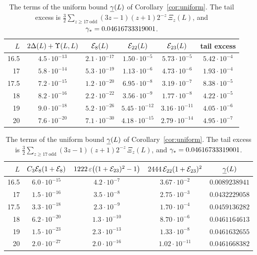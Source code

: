 \begin{table}[ht]
\centering\small
\begin{tabular}{@{}rccccc@{}}
\toprule
$L$ & $2\Delta(L)+\Upsilon(L,L)$ & $\mathcal{E}_8(L)$ & $\mathcal{E}_{22}(L)$ & $\mathcal{E}_{23}(L)$ & tail excess\\
\midrule
16.5 & $4.5\cdot10^{-13}$ & $2.1\cdot10^{-17}$ & $1.50\cdot10^{-5}$ & $5.73\cdot10^{-5}$ & $5.42\cdot10^{-4}$\\
17   & $5.8\cdot10^{-14}$ & $5.3\cdot10^{-19}$ & $1.13\cdot10^{-6}$ & $4.73\cdot10^{-6}$ & $1.93\cdot10^{-4}$\\
17.5 & $7.2\cdot10^{-15}$ & $1.2\cdot10^{-20}$ & $6.95\cdot10^{-8}$ & $3.19\cdot10^{-7}$ & $8.38\cdot10^{-5}$\\
18   & $8.2\cdot10^{-16}$ & $2.2\cdot10^{-22}$ & $3.56\cdot10^{-9}$ & $1.77\cdot10^{-8}$ & $4.22\cdot10^{-5}$\\
19   & $9.0\cdot10^{-18}$ & $5.2\cdot10^{-26}$ & $5.45\cdot10^{-12}$ & $3.16\cdot10^{-11}$ & $4.05\cdot10^{-6}$\\
20   & $7.6\cdot10^{-20}$ & $7.1\cdot10^{-30}$ & $4.18\cdot10^{-15}$ & $2.79\cdot10^{-14}$ & $4.95\cdot10^{-7}$\\
\bottomrule
\end{tabular}

\medskip
\begin{tabular}{@{}rcccc@{}}
\toprule
$L$ & $C_{3}\mathcal{E}_8(1+\mathcal{E}_8)$ & $1222\,\varepsilon\bigl((1+\mathcal{E}_{23})^2-1\bigr)$ & $2444\,\mathcal{E}_{22}(1+\mathcal{E}_{23})^2$ & $\underline{\gamma}(L)$\\
\midrule
16.5 & $6.0\cdot10^{-15}$ & $4.2\cdot10^{-7}$ & $3.67\cdot10^{-2}$ & $0.0089238941$\\
17   & $1.5\cdot10^{-16}$ & $3.5\cdot10^{-8}$ & $2.75\cdot10^{-3}$ & $0.0432229058$\\
17.5 & $3.3\cdot10^{-18}$ & $2.3\cdot10^{-9}$ & $1.70\cdot10^{-4}$ & $0.0459136282$\\
18   & $6.2\cdot10^{-20}$ & $1.3\cdot10^{-10}$ & $8.70\cdot10^{-6}$ & $0.0461164613$\\
19   & $1.5\cdot10^{-23}$ & $2.3\cdot10^{-13}$ & $1.33\cdot10^{-8}$ & $0.0461632655$\\
20   & $2.0\cdot10^{-27}$ & $2.0\cdot10^{-16}$ & $1.02\cdot10^{-11}$ & $0.0461668382$\\
\bottomrule
\end{tabular}
\caption{The terms of the uniform bound $\underline{\gamma}(L)$ of Corollary~\ref{cor:uniform}. The tail excess is
$\frac32\sum_{z\ge17\ \mathrm{odd}}(3z-1)(z+1)2^{-z}\,\Xi_z(L)$, and $\gamma_{*}=0.04616733319001$.}
\label{tab:constants}
\end{table}

